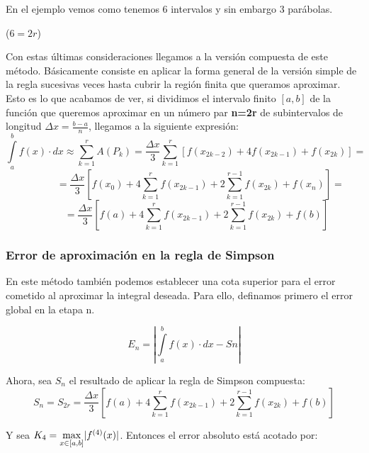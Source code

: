\documentclass[12pt]{article}
\begin{document}
En el ejemplo vemos como tenemos 6 intervalos y sin embargo 3 parábolas. \begin{center}($6=2r$)\end{center}

Con estas últimas consideraciones llegamos a la versión compuesta de este método. Básicamente consiste en aplicar la forma general de la versión simple de la regla sucesivas veces hasta cubrir la región finita que queramos aproximar.\\

Esto es lo que acabamos de ver, si dividimos el intervalo finito $[a,b]$ de la función que queremos aproximar en un número par \textbf{n=2r} de subintervalos de longitud $\Delta x=\frac{b-a}{n}$, llegamos a la siguiente expresión:
\begin{equation*}
\int \limits_{a}^{b} f(x) \cdot dx \approx 
 \sum_{k=1}^{r}A(P_k) =
\frac{\Delta x}{3}\sum_{k=1}^{r}[f(x_{2k-2})+4f(x_{2k-1})+f(x_{2k})] =
\end{equation*}
\begin{equation*}
\;\;\;\;\;\;\;\;\;\;\;\;
=\frac{\Delta x}{3}[f(x_0)+4\sum_{k=1}^{r}f(x_{2k-1})+2\sum_{k=1}^{r-1}f(x_{2k})+f(x_n)] =
\end{equation*}
\begin{equation}
\;\;\;\;\;\;\;\;\;
=\frac{\Delta x}{3}[f(a)+4\sum_{k=1}^{r}f(x_{2k-1})+2\sum_{k=1}^{r-1}f(x_{2k})+f(b)]
\end{equation}

\subsubsection{Error de aproximación en la regla de Simpson}

En este método también podemos establecer una cota superior para el error cometido al aproximar la integral deseada. Para ello, definamos primero el error global en la etapa n.

\begin{equation}
E_n=\left |\displaystyle \int \limits_{a}^{b} f(x) \cdot dx - Sn\right |
\end{equation}

Ahora, sea $S_n$ el resultado de aplicar la regla de Simpson compuesta:
\begin{equation}
S_n = S_{2r} = \frac{\Delta x}{3}
[f(a)+4\sum_{k=1}^{r}f(x_{2k-1})+2\sum_{k=1}^{r-1}f(x_{2k})+f(b)]
\end{equation}

Y sea $K_4 = \smash{\displaystyle\max_{x \in [a,b]}} |f^{(4)}(x)|$. Entonces el error absoluto está acotado por:
\end{document}
